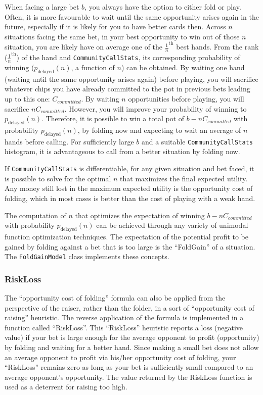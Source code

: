 When facing a large bet $b$, you always have the option to either fold or play.
Often, it is more favourable to wait until the same opportunity arises again in the future, especially if it is likely for you to have better cards then.
Across $n$ situations facing the same bet, in your best opportunity to win out of those $n$ situation, you are likely have on average one of the $\frac{1}{n}^{\mathrm{th}}$ best hands.
From the rank ($\frac{1}{n}^{\mathrm{th}}$) of the hand and \texttt{CommunityCallStats}, its corresponding probability of winning ($p_{\mathrm{delayed}}(n)$, a function of $n$) can be obtained.
By waiting one hand (waiting until the same opportunity arises again) before playing, you will sacrifice whatever chips you have already committed to the pot in previous bets leading up to this one: $C_{committed}$.
By waiting $n$ opportunities before playing, you will sacrifice $n C_{committed}$.
However, you will improve your probability of winning to $p_{\mathrm{delayed}}(n)$.
Therefore, it is possible to win a total pot of $b-n C_{committed}$ with probability $p_{\mathrm{delayed}}(n)$, by folding now and expecting to wait an average of $n$ hands before calling.
For sufficiently large $b$ and a suitable \texttt{CommunityCallStats} histogram, it is advantageous to call from a better situation by folding now.

If \texttt{CommunityCallStats} is differentiable, for any given situation and bet faced, it is possible to solve for the optimal $n$ that maximizes the final expected utility.
Any money still lost in the maximum expected utility is the opportunity cost of folding, which in most cases is better than the cost of playing with a weak hand.

The computation of $n$ that optimizes the expectation of winning $b-n C_{committed}$ with probability $p_{\mathrm{delayed}}(n)$ can be achieved through any variety of unimodal function optimization techniques.
The expectation of the potential profit to be gained by folding against a bet that is too large is the ``FoldGain'' of a situation.
The \texttt{FoldGainModel} class implements these concepts.

\subsubsection{RiskLoss}
\label{sec:RiskLoss}
The ``opportunity cost of folding'' formula can also be applied from the perspective of the raiser, rather than the folder, in a sort of ``opportunity cost of raising'' heuristic.
The reverse application of the formula is implemented in a function called ``RiskLoss''.
This ``RiskLoss'' heuristic reports a loss (negative value) if your bet is large enough for the average opponent to profit (opportunity) by folding and waiting for a better hand.
Since making a small bet does not allow an average opponent to profit via his/her opportunity cost of folding, your ``RiskLoss'' remains zero as long as your bet is sufficiently small compared to an average opponent's opportunity.
The value returned by the RiskLoss function is used as a deterrent for raising too high.


